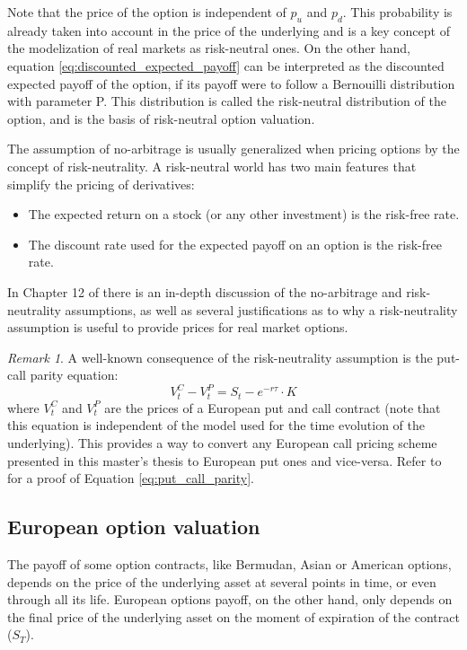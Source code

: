 \documentclass[12,twoside]{mammeTFM}
\theoremstyle{definition}
\theoremstyle{remark}
\newtheorem{remark}[thm]{Remark}
\begin{document}
Note that the price of the option is independent of $p_u$ and $p_d$. This probability is already taken into account in the price of the underlying and is a key concept of the modelization of real markets as risk-neutral ones. On the other hand, equation \ref{eq:discounted_expected_payoff} can be interpreted as the discounted expected payoff of the option, if its payoff were to follow a Bernouilli distribution with parameter P. This distribution is called the risk-neutral distribution of the option, and is the basis of risk-neutral option valuation.

The assumption of no-arbitrage is usually generalized when pricing options by the concept of risk-neutrality. A risk-neutral world has two main features that simplify the pricing of derivatives:
\begin{itemize}
\item The expected return on a stock (or any other investment) is the risk-free rate.
\item The discount rate used for the expected payoff on an option is the risk-free rate.
\end{itemize}

In Chapter 12 of \cite{hul09} there is an in-depth discussion of the no-arbitrage and risk-neutrality assumptions, as well as several justifications as to why a risk-neutrality assumption is useful to provide prices for real market options.

\begin{remark}
A well-known consequence of the risk-neutrality assumption is the put-call parity equation:
\begin{equation}\label{eq:put_call_parity}
V_t^C - V_t^P = S_t - e^{-r\tau} \cdot K
\end{equation}
where $V_t^C$ and $V_t^P$ are the prices of a European put and call contract (note that this equation is independent of the model used for the time evolution of the underlying). This provides a way to convert any European call pricing scheme presented in this master's thesis to European put ones and vice-versa. Refer to \cite{hul09} for a proof of Equation \ref{eq:put_call_parity}.
\end{remark}

\subsection{European option valuation} \label{subsec:european_option_valuation}
The payoff of some option contracts, like Bermudan, Asian or American options, depends on the price of the underlying asset at several points in time, or even through all its life. European options payoff, on the other hand, only depends on the final price of the underlying asset on the moment of expiration of the contract ($S_T$). 
\end{document}
